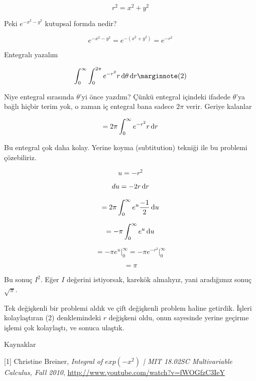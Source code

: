 \documentclass[12pt,fleqn]{article}\usepackage{../../common}
\begin{document}
$$ r^2 = x^2 + y^2 $$

Peki $e^{-x^2-y^2}$ kutupsal formda nedir? 

$$ e^{-x^2-y^2} = e^{-(x^2+y^2)} = e^{-r^2} $$

Entegralı yazalım

$$
\int_{0}^{\infty} \int_{0}^{2\pi} e^{-r^2} r \ud \theta \ud r 
\mlabel{2}
$$

Niye entegral sırasında $\theta$'yi önce yazdım? Çünkü entegral içindeki
ifadede $\theta$'ya bağlı hiçbir terim yok, o zaman iç entegral bana sadece
$2\pi$ verir. Geriye kalanlar

$$=  2\pi \int_{0}^{\infty} e^{-r^2} r \,\mathrm{d} r $$

Bu entegral çok daha kolay. Yerine koyma (subtitution) tekniği ile bu
problemi çözebiliriz. 

$$ u = -r^2 $$

$$ du =  -2r \,\mathrm{d} r$$

$$=  2\pi \int_{0}^{\infty} e^u \frac{-1}{2} \,\mathrm{d} u $$

$$=  -\pi \int_{0}^{\infty} e^u \,\mathrm{d} u $$

$$=  -\pi  e^u  \bigg|_{0}^{\infty} = -\pi  e^{-r^2}  \bigg|_{0}^{\infty} $$

$$ = \pi $$

Bu sonuç $I^2$. Eğer $I$ değerini istiyorsak, karekök almalıyız, yani
aradığımız sonuç $\sqrt{\pi}$. 

Tek değişkenli bir problemi aldık ve çift değişkenli problem haline
getirdik. İşleri kolaylaştıran (2) denklemindeki $r$ değişkeni oldu, onun
sayesinde yerine geçirme işlemi çok kolaylaştı, ve sonuca ulaştık. 

Kaynaklar

[1] Christine Breiner, {\em Integral of $exp(-x^2)$ | MIT 18.02SC Multivariable
  Calculus, Fall 2010}, \url{http://www.youtube.com/watch?v=fWOGfzC3IeY}
\end{document}
